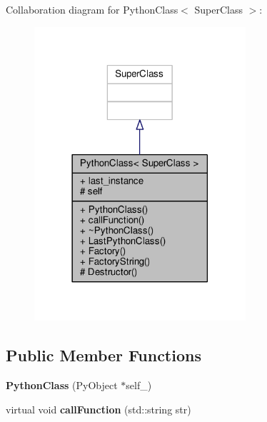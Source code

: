 Collaboration diagram for Python\+Class$<$ Super\+Class $>$\+:
\nopagebreak
\begin{figure}[H]
\begin{center}
\leavevmode
\includegraphics[width=222pt]{d8/db3/classPythonClass__coll__graph}
\end{center}
\end{figure}
\subsection*{Public Member Functions}
\begin{DoxyCompactItemize}
\item 
{\bfseries Python\+Class} (Py\+Object $\ast$self\+\_\+)\hypertarget{classPythonClass_aed85877d6b8206e64b7431f8706197e2}{}\label{classPythonClass_aed85877d6b8206e64b7431f8706197e2}

\item 
virtual void {\bfseries call\+Function} (std\+::string str)\hypertarget{classPythonClass_aada37257df60fbc1056bb91e12db2236}{}\label{classPythonClass_aada37257df60fbc1056bb91e12db2236}

\end{DoxyCompactItemize}

